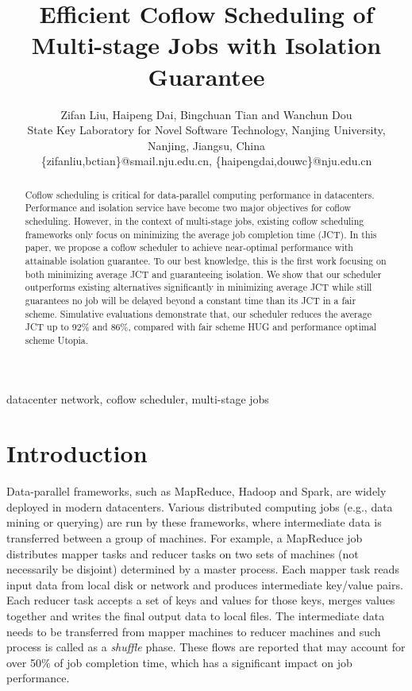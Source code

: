 \documentclass[10pt, conference, letterpaper]{IEEEtran}
\begin{document}
\title{Efficient Coflow Scheduling of Multi-stage Jobs with Isolation Guarantee}

\author{Zifan Liu, Haipeng Dai, Bingchuan Tian and Wanchun Dou\\
State Key Laboratory for Novel Software Technology, Nanjing University, Nanjing, Jiangsu, China\\
\{zifanliu,bctian\}@smail.nju.edu.cn, \{haipengdai,douwc\}@nju.edu.cn}

\maketitle

\begin{abstract}
Coflow scheduling is critical for data-parallel computing performance in datacenters. Performance and isolation service have become two major objectives for coflow scheduling. However, in the context of multi-stage jobs, existing coflow scheduling frameworks only focus on minimizing the average job completion time (JCT). In this paper, we propose a coflow scheduler to achieve near-optimal performance with attainable isolation guarantee. To our best knowledge, this is the first work focusing on both minimizing average JCT and guaranteeing isolation. We show that our scheduler outperforms existing alternatives significantly in minimizing average JCT while still guarantees no job will be delayed beyond a constant time than its JCT in a fair scheme. Simulative evaluations demonstrate that, our scheduler reduces the average JCT up to 92\% and 86\%, compared with fair scheme HUG and performance optimal scheme Utopia.
\end{abstract}

\begin{IEEEkeywords}
datacenter network, coflow scheduler, multi-stage jobs 
\end{IEEEkeywords}

\section{Introduction}
Data-parallel frameworks, such as MapReduce\cite{MapReduce}, Hadoop\cite{Hadoop} and Spark\cite{Spark}, are widely deployed in modern datacenters. Various distributed computing jobs (e.g., data mining or querying) are run by these frameworks, where intermediate data is transferred between a group of machines. For example, a MapReduce job distributes mapper tasks and reducer tasks on two sets of machines (not necessarily be disjoint) determined by a master process. Each mapper task reads input data from local disk or network and produces intermediate key/value pairs. Each reducer task accepts a set of keys and values for those keys, merges values together and writes the final output data to local files. The intermediate data needs to be transferred from mapper machines to reducer machines and such process is called as a \emph{shuffle} phase. These flows are reported that may account for over 50\% of job completion time, which has a significant impact on job performance.
\end{document}
